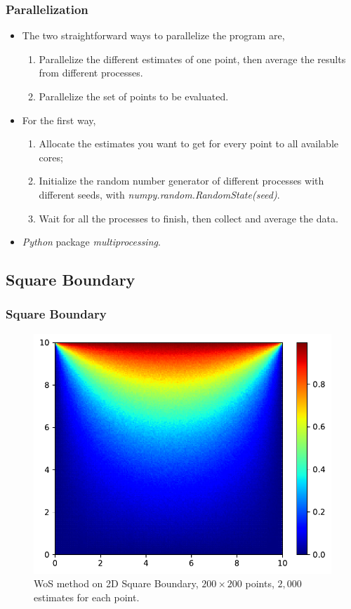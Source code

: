 \documentclass{beamer}
\begin{document}
\begin{frame}
\frametitle{Parallelization}
\begin{itemize}
\item The two straightforward ways to parallelize the program are,
\begin{enumerate}
    \item Parallelize the different estimates of one point, then average the results from different processes.
    \item Parallelize the set of points to be evaluated.
\end{enumerate}
\item For the first way,
\begin{enumerate}
    \item Allocate the estimates you want to get for every point to all available cores;
    \item Initialize the random number generator of different processes with different seeds, with \emph{numpy.random.RandomState(seed)}.
    \item Wait for all the processes to finish, then collect and average the data.
\end{enumerate}
\item \emph{Python} package \emph{multiprocessing}.
\end{itemize}
\end{frame}


\subsection{Square Boundary}

\begin{frame}
\frametitle{Square Boundary}
\begin{figure}[htbp]
    \centering
    \includegraphics[width=.7\textwidth]{./figs/wos_s}
    \caption{\label{fig:wos_s} WoS method on 2D Square Boundary, $200\times 200$ points, $2,000$ estimates for each point.}
\end{figure}
\end{frame}
\end{document}
